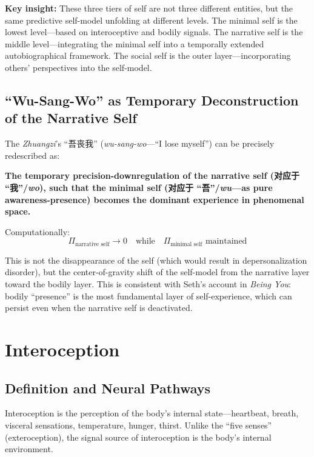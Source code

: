 \documentclass[11pt,a4paper]{article}
\begin{document}
\textbf{Key insight:} These three tiers of self are not three different entities, but the same predictive self-model unfolding at different levels. The minimal self is the lowest level---based on interoceptive and bodily signals. The narrative self is the middle level---integrating the minimal self into a temporally extended autobiographical framework. The social self is the outer layer---incorporating others' perspectives into the self-model.

\subsection{``Wu-Sang-Wo'' as Temporary Deconstruction of the Narrative Self}

The \textit{Zhuangzi}'s ``吾丧我'' (\textit{wu-sang-wo}---``I lose myself'') can be precisely redescribed as:

\textbf{The temporary precision-downregulation of the narrative self (对应于 ``我''/\textit{wo}), such that the minimal self (对应于 ``吾''/\textit{wu}---as pure awareness-presence) becomes the dominant experience in phenomenal space.}

Computationally:
\begin{equation}
\Pi_{\text{narrative self}} \rightarrow 0 \quad \text{while} \quad \Pi_{\text{minimal self}} \text{ maintained}
\end{equation}

This is not the disappearance of the self (which would result in depersonalization disorder), but the center-of-gravity shift of the self-model from the narrative layer toward the bodily layer. This is consistent with Seth's \cite{Seth2021} account in \textit{Being You}: bodily ``presence'' is the most fundamental layer of self-experience, which can persist even when the narrative self is deactivated.

\section{Interoception}

\subsection{Definition and Neural Pathways}

Interoception is the perception of the body's internal state---heartbeat, breath, visceral sensations, temperature, hunger, thirst. Unlike the ``five senses'' (exteroception), the signal source of interoception is the body's internal environment.
\end{document}

